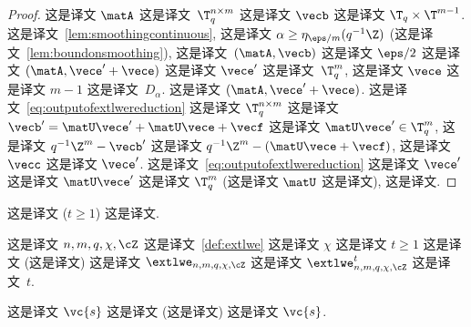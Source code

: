 \begin{proof}
这是译文 $\matA$ 这是译文~$\T_q^{n\times m}$ 这是译文 $\vecb$ 这是译文 $\T_q \times \T^{m-1}$. 这是译文~\ref{lem:smoothingcontinuous}, 这是译文 $\alpha \ge \eta_{\eps/m}(q^{-1}\Z)$ (这是译文~\ref{lem:boundonsmoothing}), 这是译文~$(\matA,\vecb)$ 这是译文 $\eps/2$ 这是译文 $(\matA, \vece' + \vece)$ 这是译文 $\vece'$ 这是译文~$\T_q^m$, 这是译文 $\vece$ 这是译文 $m-1$ 这是译文~$D_\alpha$. 这是译文 $(\matA,\vece'+\vece)$. 这是译文~\eqref{eq:outputofextlwereduction} 这是译文 $\T_q^{n \times m}$ 这是译文 $\vecb' = \matU \vece' + \matU \vece + \vecf$ 这是译文 $\matU \vece' \in \T_q^m$, 这是译文 $q^{-1}\Z^m - \vecb'$ 这是译文 $q^{-1}\Z^m - (\matU \vece + \vecf)$, 这是译文 $\vecc$ 这是译文 $\vece'$. 这是译文~\eqref{eq:outputofextlwereduction} 这是译文 $\vece'$ 这是译文 $\matU \vece'$ 这是译文 $\T_q^m$ (这是译文 $\matU$ 这是译文), 这是译文.
\end{proof}

这是译文 ($t \ge 1$) 这是译文. 



\begin{lemma}\label{lem:multiinstanceextlwe} 这是译文 $n, m, q, \chi, \cZ$ 这是译文~\ref{def:extlwe} 这是译文 $\chi$ 这是译文 $t \ge 1$ 这是译文 (这是译文) 这是译文 $\extlwe_{n,m,q,\chi,\cZ}$ 这是译文 $\extlwe^t_{n,m,q,\chi,\cZ}$ 这是译文~$t$.
\end{lemma}

这是译文 $\vc{s}$ 这是译文 (这是译文) 这是译文 $\vc{s}$.

